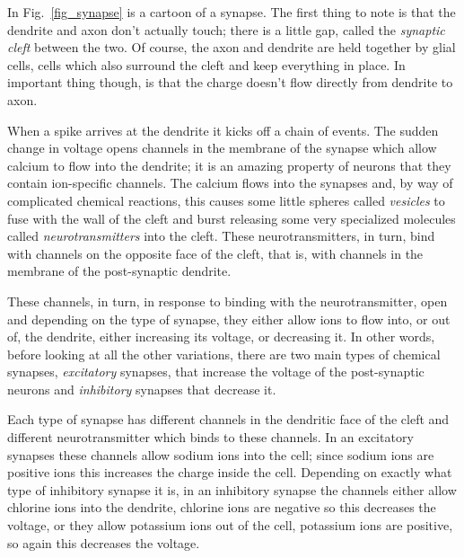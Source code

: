 \documentclass[12pt]{article}
\begin{document}
In Fig.~\ref{fig_synapse} is a cartoon of a synapse. The first thing
to note is that the dendrite and axon don't actually touch; there is a
little gap, called the \textsl{synaptic cleft} between the two. Of
course, the axon and dendrite are held together by glial cells, cells
which also surround the cleft and keep everything in place. In
important thing though, is that the charge doesn't flow directly from dendrite to axon.

When a spike arrives at the dendrite it kicks off a chain of
events. The sudden change in voltage opens channels in the membrane of
the synapse which allow calcium to flow into the dendrite; it is an
amazing property of neurons that they contain ion-specific
channels. The calcium flows into the synapses and, by way of
complicated chemical reactions, this causes some little spheres called
\textsl{vesicles} to fuse with the wall of the cleft and burst
releasing some very specialized molecules called
\textsl{neurotransmitters} into the cleft. These neurotransmitters, in
turn, bind with channels on the opposite face of the cleft, that is,
with channels in the membrane of the post-synaptic dendrite.

These channels, in turn, in response to binding with the
neurotransmitter, open and depending on the type of synapse, they
either allow ions to flow into, or out of, the dendrite, either
increasing its voltage, or decreasing it. In other words, before
looking at all the other variations, there are two main types of
chemical synapses, \textsl{excitatory} synapses, that increase the
voltage of the post-synaptic neurons and \textsl{inhibitory} synapses
that decrease it.

Each type of synapse has different channels in the dendritic face of
the cleft and different neurotransmitter which binds to these
channels. In an excitatory synapses these channels allow sodium ions
into the cell; since sodium ions are positive ions this increases the
charge inside the cell. Depending on exactly what type of inhibitory
synapse it is, in an inhibitory synapse the channels either allow
chlorine ions into the dendrite, chlorine ions are negative so this
decreases the voltage, or they allow potassium ions out of the cell,
potassium ions are positive, so again this decreases the voltage.
\end{document}
